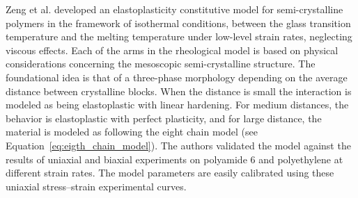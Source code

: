 

Zeng et al. \citep{zengConstitutiveModelSemicrystalline2010} developed an elastoplasticity constitutive model for semi-crystalline polymers in the framework of isothermal conditions, between the glass transition temperature and the melting temperature under low-level strain rates, neglecting viscous effects.
Each of the arms in the rheological model is based on physical considerations concerning the mesoscopic semi-crystalline structure.
The foundational idea is that of a three-phase morphology depending on the average distance between crystalline blocks.
When the distance is small the interaction is modeled as being elastoplastic with linear hardening.
For medium distances, the behavior is elastoplastic with perfect plasticity, and for large distance, the material is modeled as following the eight chain model (see Equation~\eqref{eq:eigth_chain_model}).
The authors validated the model against the results of uniaxial and biaxial experiments on polyamide 6 and polyethylene at different strain rates.
The model parameters are easily calibrated using these uniaxial stress–strain experimental curves.

